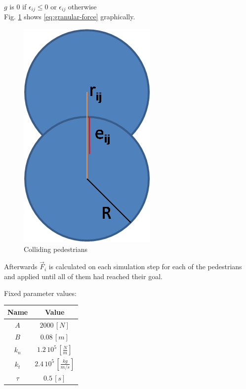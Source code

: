 \documentclass[english]{article}
\providecommand{\tabularnewline}{\\}
\begin{document}
    $g$ is $0$ if $\epsilon_{ij}\leq0$ or $\epsilon_{ij}$ otherwise\\

    Fig. \ref{fig:colliding-pedestrians} shows \ref{eq:granular-force} graphically.
    
    \begin{figure}[h]
        \begin{centering}
        \includegraphics[scale=0.4]{pics/sfm/ganular} \par
        \end{centering}
        \caption{Colliding pedestrians\label{fig:colliding-pedestrians}}
    \end{figure}

    Afterwards $\vec{F}_{i}$ is calculated on each simulation step for
    each of the pedestrians and applied until all of them had reached
    their goal.
    
    Fixed parameter values:
    
    \begin{center}
    \begin{tabular}{|c|c|}
        \hline 
        Name  & Value\tabularnewline
        \hline 
        \hline 
        $A$  & $2000\,[N]$\tabularnewline
        \hline 
        $B$  & $0.08\,[m]$\tabularnewline
        \hline 
        $k_{n}$  & $1.2\,10^{5}\,[\frac{N}{m}]$\tabularnewline
        \hline 
        $k_{t}$  & $2.4\,10^{5}\,[\frac{kg}{m/s}]$\tabularnewline
        \hline 
        $\tau$  & $0.5\,[s]$\tabularnewline
        \hline 
    \end{tabular}
    \par
    \end{center}
    
\end{document}
